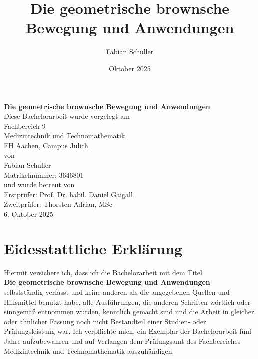 \documentclass{article}
\title{Die geometrische brownsche Bewegung und Anwendungen}
\author{Fabian Schuller}
\date{Oktober 2025}
\numberwithin{equation}{subsection} %
\theoremstyle{mystyle}
\begin{document}

\begin{center}
    \vspace*{2cm}
    {\LARGE \textbf{Die geometrische brownsche Bewegung und Anwendungen}}\\[2cm]

    {\large Diese Bachelorarbeit wurde vorgelegt am\\[0.5cm]
    
    Fachbereich 9 \\[0.3cm]
    Medizintechnik und Technomathematik\\[0.3cm]
    FH Aachen, Campus Jülich\\[0.9cm]
   
    von\\[0.9cm]
    Fabian Schuller\\
    Matrikelnummer: 3646801\\[0.9cm]

    und wurde betreut von\\[0.9cm]

    Erstprüfer: Prof. Dr. habil. Daniel Gaigall\\[0.3cm]
    Zweitprüfer: Thorsten Adrian, MSc\\[2cm]
}
    6. Oktober 2025

    \vfill
\end{center}

\thispagestyle{empty}

\newpage

\section*{Eidesstattliche Erklärung}

\noindent
Hiermit versichere ich, dass ich die Bachelorarbeit mit dem Titel \\[0.5cm] \textbf{Die geometrische brownsche Bewegung und Anwendungen} \\[0.5cm]selbstständig verfasst und keine anderen als die angegebenen Quellen und Hilfsmittel benutzt habe, alle Ausführungen, die anderen Schriften wörtlich oder sinngemäß entnommen wurden, kenntlich gemacht sind und die Arbeit in gleicher oder ähnlicher Fassung noch nicht Bestandteil einer Studien- oder Prüfungsleistung war. Ich verpflichte mich, ein Exemplar der Bachelorarbeit fünf Jahre aufzubewahren und auf Verlangen dem Prüfungsamt des Fachbereiches Medizintechnik und Technomathematik auszuhändigen.
\\[2cm]
\end{document}
